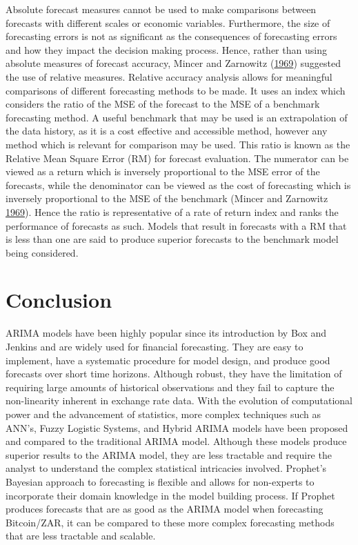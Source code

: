 \documentclass[12pt,preprint, authoryear]{elsarticle}
\numberwithin{equation}{section}
\numberwithin{figure}{section}
\numberwithin{table}{section}
\begin{document}
Absolute forecast measures cannot be used to make comparisons between
forecasts with different scales or economic variables. Furthermore, the
size of forecasting errors is not as significant as the consequences of
forecasting errors and how they impact the decision making process.
Hence, rather than using absolute measures of forecast accuracy, Mincer
and Zarnowitz (\protect\hyperlink{ref-mincer1969}{1969}) suggested the
use of relative measures. Relative accuracy analysis allows for
meaningful comparisons of different forecasting methods to be made. It
uses an index which considers the ratio of the MSE of the forecast to
the MSE of a benchmark forecasting method. A useful benchmark that may
be used is an extrapolation of the data history, as it is a cost
effective and accessible method, however any method which is relevant
for comparison may be used. This ratio is known as the Relative Mean
Square Error (RM) for forecast evaluation. The numerator can be viewed
as a return which is inversely proportional to the MSE error of the
forecasts, while the denominator can be viewed as the cost of
forecasting which is inversely proportional to the MSE of the benchmark
(Mincer and Zarnowitz \protect\hyperlink{ref-mincer1969}{1969}). Hence
the ratio is representative of a rate of return index and ranks the
performance of forecasts as such. Models that result in forecasts with a
RM that is less than one are said to produce superior forecasts to the
benchmark model being considered.

\section{Conclusion}\label{conclusion}

ARIMA models have been highly popular since its introduction by Box and
Jenkins and are widely used for financial forecasting. They are easy to
implement, have a systematic procedure for model design, and produce
good forecasts over short time horizons. Although robust, they have the
limitation of requiring large amounts of historical observations and
they fail to capture the non-linearity inherent in exchange rate data.
With the evolution of computational power and the advancement of
statistics, more complex techniques such as ANN's, Fuzzy Logistic
Systems, and Hybrid ARIMA models have been proposed and compared to the
traditional ARIMA model. Although these models produce superior results
to the ARIMA model, they are less tractable and require the analyst to
understand the complex statistical intricacies involved. Prophet's
Bayesian approach to forecasting is flexible and allows for non-experts
to incorporate their domain knowledge in the model building process. If
Prophet produces forecasts that are as good as the ARIMA model when
forecasting Bitcoin/ZAR, it can be compared to these more complex
forecasting methods that are less tractable and scalable.
\end{document}
